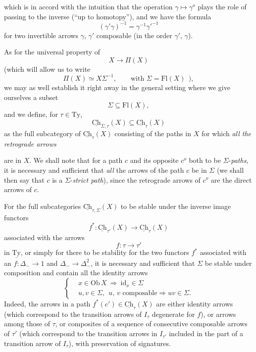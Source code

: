 \documentclass[11pt]{article}
\newcommand{\printedpage}[1]{\marginpar{\footnotesize p.~#1}}
\newcommand{\msp}[1]{\marginpar{\footnotesize [#1]}}
\newcommand{\Ch}{\underline{\mathrm{Ch}}}
\newcommand{\Ty}{\mathrm{Ty}}
\newcommand{\uTy}{\underline{\mathrm{Ty}}}
\newcommand{\Fl}{\mathrm{Fl}}
\newcommand{\id}{\mathrm{id}}
\begin{document}
\printedpage{44}

which is in accord with the intuition that the operation $\gamma \longmapsto \gamma^o$ plays the role of passing to the inverse (``up to homotopy''), and we have the formula
\[
(\gamma'\gamma)^{-1} = \gamma^{-1}\gamma'^{-1}
\]
for two invertible arrows $\gamma$, $\gamma'$ composable (in the order $\gamma'$, $\gamma$).

As for the universal property of
\[
X \longrightarrow \Pi(X)
\]
(which will allow us to write
\[
\Pi(X) \simeq X\Sigma^{-1}, \qquad \text{with } \Sigma = \Fl(X) \ \ ),
\]
we may as well establish it right away in the general setting where we give ourselves a subset
\[
\Sigma \subseteq \Fl(X),
\]
and we define, for $\tau \in \Ty$,
\[
\Ch_{\Sigma,\tau}(X) \subseteq \Ch_{\tau}(X)
\]
as the full subcategory of $\Ch_{\tau}(X)$ consisting of the paths in $X$ for which \textit{all the retrograde arrows}

\msp{page 66}

are in $X$. We shall note that for a path $c$ and its opposite $c^o$ both to be $\Sigma$-\textit{paths,} it is necessary and sufficient that \textit{all} the arrows of the path $c$ be in $\Sigma$ (we shall then say that $c$ is a $\Sigma$-\textit{strict path}), since the retrograde arrows of $c^o$ are the direct arrows of $c$.

For the full subcategories $\Ch_{\tau,\Sigma}(X)$ to be stable under the inverse image functors
\[
f^* : \Ch_{\tau'}(X) \longrightarrow \Ch_{\tau}(X)
\]
associated with the arrows
\[
f : \tau \longrightarrow \tau'
\]
in $\uTy$, or simply for there to be stability for the two functors $f^*$ associated with an $f : \Delta_- \longrightarrow 1$ and $\Delta_- \longrightarrow \Delta_-^2$, it is necessary and sufficient that $\Sigma$ be stable under composition and contain all the identity arrows %
\[
\left\{
\begin{aligned}
& x \in \mathrm{Ob}\,X \ \Longrightarrow \ \id_x \in \Sigma \\
& u, v \in \Sigma, \ \ u,\, v \text{ composable} \Longrightarrow uv \in \Sigma.
\end{aligned}
\right.
\]
Indeed, the arrows in a path $f^*(c') \in \Ch_{\tau}(X)$ are either identity arrows (which correspond to the transition arrows of $I_\tau$ degenerate for $f$), or arrows among those of $\tau$, or composites of a sequence of consecutive composable arrows of $\tau'$ (which correspond to the transition arrows in $I_{\tau'}$ included in the part of a transition arrow of $I_\tau$), with preservation of signatures.
\end{document}
